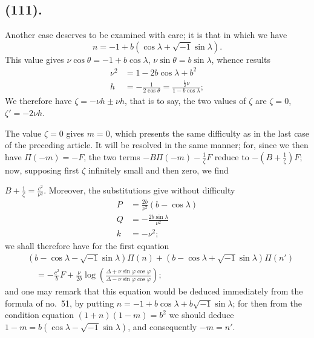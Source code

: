 \documentclass{article}
\begin{document}
\subsection*{(111).}

Another case deserves to be examined with care; it is that in which we have
\[ n=-1+b(\cos\lambda+\sqrt{-1}\sin\lambda). \]
This value gives $\nu\cos\theta=-1+b\cos\lambda$, $\nu\sin\theta=b\sin\lambda$, whence results
\[ \begin{aligned} \nu^{2}&=1-2b\cos\lambda+b^{2}\\ h&=-\frac{1}{2\cos\theta}=\frac{\frac{1}{2}\nu}{1-b\cos\lambda}; \end{aligned} \]
We therefore have $\zeta=-\nu h\pm\nu h$, that is to say, the two values of $\zeta$ are $\zeta=0$, $\zeta'=-2\nu h$.

The value $\zeta=0$ gives $m=0$, which presents the same difficulty as in the last case of the preceding article. It will be resolved in the same manner; for, since we then have $\Pi(-m)=-F$, the two terms $-B\Pi(-m)-\frac{1}{\zeta}F$ reduce to $-\left(B+\frac{1}{\zeta}\right)F$; now, supposing first $\zeta$ infinitely small and then zero, we find

$B+\frac{1}{\zeta}=\frac{c^{2}}{\nu^{2}}$. Moreover, the substitutions give without difficulty
\[ \begin{aligned} P&=\frac{2b}{\nu^{2}}(b-\cos\lambda)\\ Q&=-\frac{2b\sin\lambda}{\nu^{2}}\\ k&=-\nu^{2}; \end{aligned} \]
we shall therefore have for the first equation
\[ \begin{aligned} &(b-\cos\lambda-\sqrt{-1}\sin\lambda)\Pi(n)+(b-\cos\lambda+\sqrt{-1}\sin\lambda)\Pi(n')\\ &\quad=-\frac{c^{2}}{b}F+\frac{\nu}{2b}\log\left(\frac{\Delta+\nu\sin\varphi\cos\varphi}{\Delta-\nu\sin\varphi\cos\varphi}\right); \end{aligned} \]
and one may remark that this equation would be deduced immediately from the formula of no.\ 51, by putting $n=-1+b\cos\lambda+b\sqrt{-1}\sin\lambda$; for then from the condition equation $(1+n)(1-m)=b^{2}$ we should deduce $1-m=b(\cos\lambda-\sqrt{-1}\sin\lambda)$, and consequently $-m=n'$.
\end{document}
